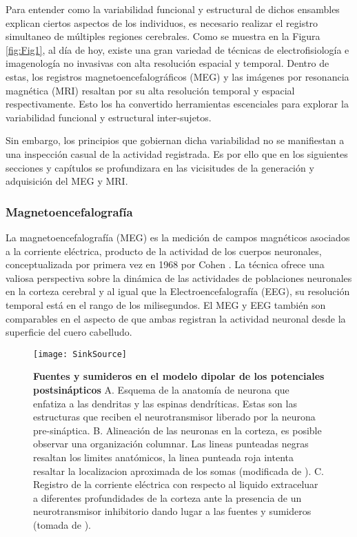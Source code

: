 \documentclass[11pt,letterpaper]{article}
\numberwithin{equation}{subsection}
\numberwithin{table}{subsection}
\begin{document}
\bigskip
\noindent Para entender como la variabilidad funcional y estructural de dichos ensambles explican ciertos aspectos de los individuos, es necesario realizar el registro simultaneo de múltiples regiones cerebrales. Como se muestra en la Figura \ref{fig:Fig1}, al día de hoy, existe una gran variedad de técnicas de electrofisiología e imagenología no invasivas con alta resolución espacial y temporal.  Dentro de estas, los registros magnetoencefalográficos (MEG) y las imágenes por resonancia magnética (MRI) resaltan por su alta resolución temporal y espacial respectivamente. Esto los ha convertido herramientas escenciales para explorar la variabilidad funcional y estructural inter-sujetos.  

\bigskip
\noindent Sin embargo, los principios que gobiernan dicha variabilidad no se manifiestan a una inspección casual de la actividad registrada. Es por ello que en los siguientes secciones y capítulos se profundizara en las vicisitudes de la generación y adquisición del MEG y MRI.

\subsubsection{Magnetoencefalografía}

\smallskip
\noindent La magnetoencefalografía (MEG) es la medición de campos magnéticos asociados a la corriente eléctrica, producto de la actividad de los cuerpos neuronales, conceptualizada por primera vez en 1968 por Cohen \cite{cohen1968magnetoencephalography}. La técnica ofrece una valiosa perspectiva sobre la dinámica de las actividades de poblaciones neuronales en la corteza cerebral y al igual que la Electroencefalografía (EEG), su resolución temporal está en el rango de los milisegundos. El MEG y EEG también son comparables en el aspecto de que ambas registran la actividad neuronal desde la superficie del cuero cabelludo. 

\begin{figure}[H]
\centering
	\texttt{[image: SinkSource]}
	\captionsetup{labelfont=bf}
	\caption{\scriptsize \textbf{Fuentes y sumideros en el modelo dipolar de los potenciales postsinápticos} A. Esquema de la anatomía de neurona que enfatiza a las dendritas y las espinas dendríticas. Estas son las estructuras que reciben el neurotransmisor liberado por la neurona pre-sináptica. B. Alineación de las neuronas en la corteza, es posible observar una organización columnar. Las lineas punteadas negras resaltan los limites anatómicos, la linea punteada roja intenta resaltar la localizacion aproximada de los somas (modificada de \cite{migliore2018physiological} ). C. Registro de la corriente eléctrica con respecto al liquido extraceluar a diferentes profundidades de la corteza ante la presencia de un neurotransmisor inhibitorio dando lugar a las fuentes y sumideros (tomada de \cite{riera2012pitfalls}).} 
	\label{fig:Fig2}
\end{figure}
\end{document}
